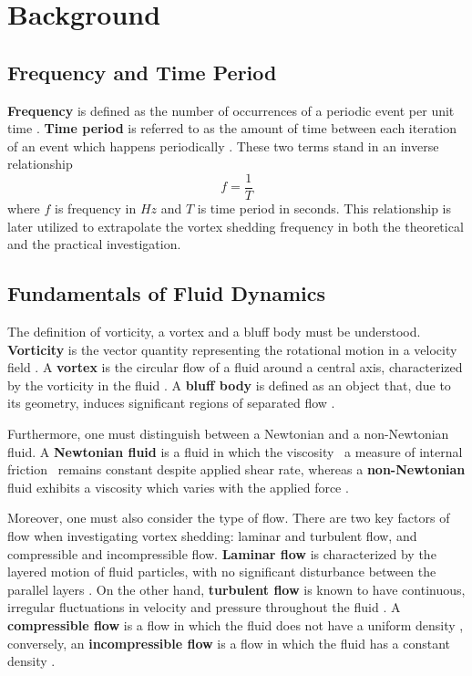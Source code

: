 \section{Background}
\subsection{Frequency and Time Period}
\label{sec:fAndT}
\textbf{Frequency} is defined as the number of occurrences of a periodic event per unit time \parencite[78]{allum2023}. \textbf{Time period} is referred to as the amount of time between each iteration of an event which happens periodically \parencite[78]{allum2023}. These two terms stand in an inverse relationship
\begin{equation}
	f = \frac{1}{T}
	\label{eq:fAndT}
\end{equation}
where $f$ is frequency in $Hz$ and $T$ is time period in seconds. This relationship is later utilized to extrapolate the vortex shedding frequency in both the theoretical and the practical investigation.
\subsection{Fundamentals of Fluid Dynamics}
The definition of vorticity, a vortex and a bluff body must be understood. \textbf{Vorticity} is the vector quantity representing the rotational motion in a velocity field \parencite[p.~2500]{holton2003_vorticity}. A \textbf{vortex} is the circular flow of a fluid around a central axis, characterized by the vorticity in the fluid \parencite[p.~390]{nitsche2006_vortex}. A \textbf{bluff body} is defined as an object that, due to its geometry, induces significant regions of separated flow \parencite[p.~561]{navalhydro1997}. 

Furthermore, one must distinguish between a Newtonian and a non-Newtonian fluid. A \textbf{Newtonian fluid} is a fluid in which the viscosity \textemdash\ a measure of internal friction \textemdash\ remains constant despite applied shear rate, whereas a \textbf{non-Newtonian} fluid exhibits a viscosity which varies with the applied force \parencite{mohn2024}. 

Moreover, one must also consider the type of flow. There are two key factors of flow when investigating vortex shedding: laminar and turbulent flow, and compressible and incompressible flow. \textbf{Laminar flow} is characterized by the layered motion of fluid particles, with no significant disturbance between the parallel layers \parencite[pp.~40--41]{versteeg2007}. On the other hand, \textbf{turbulent flow} is known to have continuous, irregular fluctuations in velocity and pressure throughout the fluid \parencite[p.~40]{versteeg2007}. A \textbf{compressible flow} is a flow in which the fluid does not have a uniform density \parencite[p.~31]{oran2002}, conversely, an \textbf{incompressible flow} is a flow in which the fluid has a constant density \parencite[p.~12]{versteeg2007}. 

